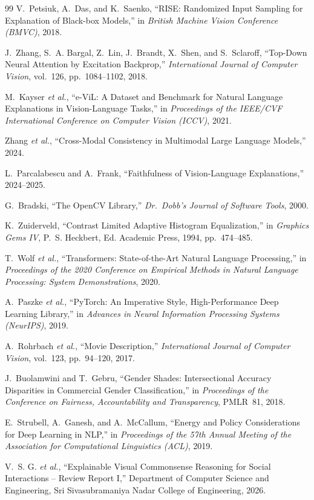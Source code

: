 \documentclass[12pt,a4paper,oneside]{report}
\begin{document}
\begin{thebibliography}{99}
V.~Petsiuk, A.~Das, and K.~Saenko, ``RISE: Randomized Input Sampling for
Explanation of Black-box Models,'' in \emph{British Machine Vision Conference
(BMVC)}, 2018.

J.~Zhang, S.~A. Bargal, Z.~Lin, J.~Brandt, X.~Shen, and S.~Sclaroff,
``Top-Down Neural Attention by Excitation Backprop,'' \emph{International
Journal of Computer Vision}, vol.~126, pp.~1084--1102, 2018.

M.~Kayser \emph{et al.}, ``e-ViL: A Dataset and Benchmark for Natural Language
Explanations in Vision-Language Tasks,'' in \emph{Proceedings of the IEEE/CVF
International Conference on Computer Vision (ICCV)}, 2021.

Zhang \emph{et al.}, ``Cross-Modal Consistency in Multimodal Large Language
Models,'' 2024.

L.~Parcalabescu and A.~Frank, ``Faithfulness of Vision-Language
Explanations,'' 2024--2025.

G.~Bradski, ``The OpenCV Library,'' \emph{Dr.\ Dobb's Journal of Software
Tools}, 2000.

K.~Zuiderveld, ``Contrast Limited Adaptive Histogram Equalization,'' in
\emph{Graphics Gems IV}, P.~S. Heckbert, Ed. Academic Press, 1994,
pp.~474--485.

T.~Wolf \emph{et al.}, ``Transformers: State-of-the-Art Natural Language
Processing,'' in \emph{Proceedings of the 2020 Conference on Empirical Methods
in Natural Language Processing: System Demonstrations}, 2020.

A.~Paszke \emph{et al.}, ``PyTorch: An Imperative Style, High-Performance Deep
Learning Library,'' in \emph{Advances in Neural Information Processing Systems
(NeurIPS)}, 2019.

A.~Rohrbach \emph{et al.}, ``Movie Description,'' \emph{International Journal
of Computer Vision}, vol.~123, pp.~94--120, 2017.

J.~Buolamwini and T.~Gebru, ``Gender Shades: Intersectional Accuracy
Disparities in Commercial Gender Classification,'' in \emph{Proceedings of the
Conference on Fairness, Accountability and Transparency}, PMLR~81, 2018.

E.~Strubell, A.~Ganesh, and A.~McCallum, ``Energy and Policy Considerations for
Deep Learning in NLP,'' in \emph{Proceedings of the 57th Annual Meeting of the
Association for Computational Linguistics (ACL)}, 2019.

V.~S. G. \emph{et al.}, ``Explainable Visual Commonsense Reasoning for Social
Interactions -- Review Report I,'' Department of Computer Science and
Engineering, Sri Sivasubramaniya Nadar College of Engineering, 2026.

\end{thebibliography}
\end{document}
